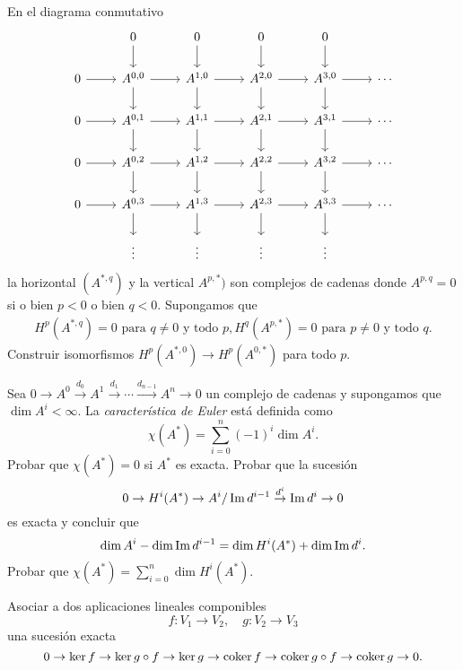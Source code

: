 \documentclass[twoside]{article}
\begin{document}
\begin{ejercicio}{4.3}
En el diagrama conmutativo
\[
\begin{tikzcd}
& 0\arrow[d] & 0\arrow[d] & 0\arrow[d] & 0\arrow[d] \\
0\arrow[r] & A^{0,0}\arrow[r]\arrow[d] & A^{1,0}\arrow[r]\arrow[d]& A^{2,0}\arrow[r]\arrow[d]  & A^{3,0}\arrow[r]\arrow[d] &\cdots\\
0\arrow[r] & A^{0,1}\arrow[r]\arrow[d] & A^{1,1}\arrow[r]\arrow[d]& A^{2,1}\arrow[r]\arrow[d]  & A^{3,1}\arrow[r]\arrow[d] &\cdots\\
0\arrow[r] & A^{0,2}\arrow[r]\arrow[d] & A^{1,2}\arrow[r]\arrow[d]& A^{2,2}\arrow[r]\arrow[d]  & A^{3,2}\arrow[r]\arrow[d] &\cdots\\
0\arrow[r] & A^{0,3}\arrow[r]\arrow[d] & A^{1,3}\arrow[r]\arrow[d]& A^{2,3}\arrow[r]\arrow[d]  & A^{3,3}\arrow[r]\arrow[d] &\cdots\\
& \vdots & \vdots & \vdots & \vdots
\end{tikzcd}
\]
la horizontal $(A^{*,q})$ y la vertical $A^{p,*})$ son complejos de cadenas donde $A^{p,q}=0$ si o bien $p<0$ o bien $q<0$. Supongamos que
\begin{gather*}
H^p(A^{*,q})=0\text{ para }q\neq 0\text{ y todo }p,
H^q(A^{p,*})=0\text{ para }p\neq 0\text{ y todo }q.
\end{gather*}
Construir isomorfismos $H^p(A^{*,0})\to H^p(A^{0,*})$ para todo $p$.
\end{ejercicio}
\begin{solucion}

\end{solucion}
\newpage

\begin{ejercicio}{4.4}
Sea $0\to A^0\overset{d_0}{\to}A^1\overset{d_1}{\to}\cdots\overset{d_{n-1}}{\to}A^n\to 0$ un complejo de cadenas y supongamos que $\dim A^i<\infty$. La \emph{característica de Euler} está definida como
\[
\chi(A^*)=\sum_{i=0}^n (-1)^i\dim A^i.
\]
Probar que $\chi(A^*)=0$ si $A^*$ es exacta. Probar que la sucesión 
\[
0\to H^i(A^*)\to A^i/\operatorname{Im} d^{i-1}\overset{d^i}{\to}\operatorname{Im} d^i\to 0
\]
es exacta y concluir que
\[
\dim A^i-\dim\operatorname{Im} d^{i-1}=\dim H^i(A^*)+\dim\operatorname{Im} d^i.
\]
Probar que $\chi(A^*)=\sum_{i=0}^n\dim H^i(A^*)$.
\end{ejercicio}
\begin{solucion}

\end{solucion}

\newpage

\begin{ejercicio}{4.5}
Asociar a dos aplicaciones lineales componibles 
\[
f:V_1\to V_2,\quad g:V_2\to V_3
\]
una sucesión exacta
\[
0\to \ker{f}\to\ker{g\circ f}\to\ker{g}\to\operatorname{coker}{f}\to\operatorname{coker}{g\circ f}\to\operatorname{coker}{g}\to 0.
\]
\end{ejercicio}
\begin{solucion}

\end{solucion}
\end{document}

